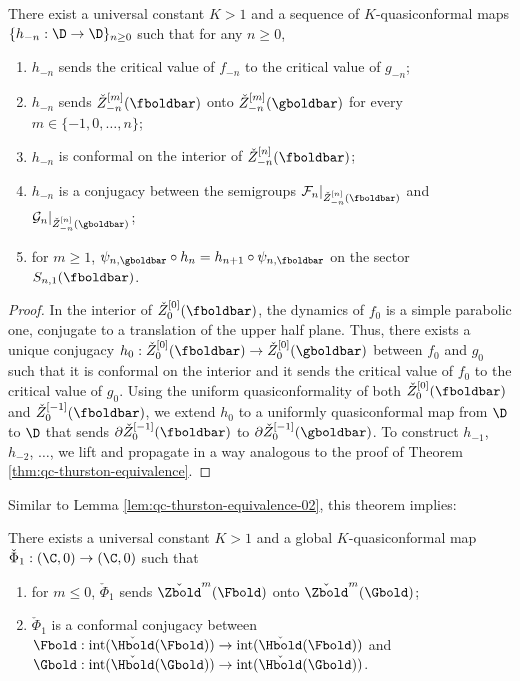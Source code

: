 \documentclass{amsart}
\begin{document}
\begin{theorem}
    There exist a universal constant $K>1$ and a sequence of $K$-quasiconformal maps $\{h_{-n} : \D \to \D\}_{n \geq 0}$ such that for any $n \geq 0$,
    \begin{enumerate}
        \item $h_{-n}$ sends the critical value of $f_{-n}$ to the critical value of $g_{-n}$;
        \item $h_{-n}$ sends $\check{Z}^{[m]}_{-n}(\fboldbar)$ onto $\check{Z}^{[m]}_{-n}(\gboldbar)$ for every $m \in \{-1,0,\ldots, n\}$;
        \item $h_{-n}$ is conformal on the interior of $\check{Z}^{[n]}_{-n}(\fboldbar)$;
        \item $h_{-n}$ is a conjugacy between the semigroups $\mathcal{F}_n|_{\check{Z}^{[n]}_{-n}(\fboldbar)}$ and $\mathcal{G}_n|_{\check{Z}^{[n]}_{-n}(\gboldbar)}$;
        \item for $m \geq 1$, $\psi_{n,\gboldbar} \circ h_n = h_{n+1} \circ \psi_{n,\fboldbar}$ on the sector $S_{n,1}(\fboldbar)$.
    \end{enumerate}
\end{theorem}

\begin{proof}
    In the interior of $\check{Z}_0^{[0]}(\fboldbar)$, the dynamics of $f_0$ is a simple parabolic one, conjugate to a translation of the upper half plane. 
    Thus, there exists a unique conjugacy $h_0: \check{Z}_0^{[0]}(\fboldbar) \to \check{Z}_0^{[0]}(\gboldbar)$ between $f_0$ and $g_0$ such that it is conformal on the interior and it sends the critical value of $f_0$ to the critical value of $g_0$.
    Using the uniform quasiconformality of both $\check{Z}_0^{[0]}(\fboldbar)$ and $\check{Z}_0^{[-1]}(\fboldbar)$, we extend $h_0$ to a uniformly quasiconformal map from $\D$ to $\D$ that sends $\partial \check{Z}_0^{[-1]}(\fboldbar)$ to $\partial \check{Z}_0^{[-1]}(\gboldbar)$.
    To construct $h_{-1}$, $h_{-2}$, $\ldots$, we lift and propagate in a way analogous to the proof of Theorem \ref{thm:qc-thurston-equivalence}.
\end{proof}

Similar to Lemma \ref{lem:qc-thurston-equivalence-02}, this theorem implies:

\begin{lemma}
    There exists a universal constant $K>1$ and a global $K$-quasiconformal map $\check{\Phi}_1: (\C,0) \to (\C,0)$ such that
    \begin{enumerate}
        \item for $m \leq 0$, $\check{\Phi}_1$ sends $\check{\Zbold}^m(\Fbold)$ onto $\check{\Zbold}^m(\Gbold)$;
        \item $\check{\Phi}_1$ is a conformal conjugacy between $\Fbold: \textnormal{int}(\check{\Hbold}(\Fbold)) \to \textnormal{int}(\check{\Hbold}(\Fbold))$ and $\Gbold: \textnormal{int}(\check{\Hbold}(\Gbold)) \to \textnormal{int}(\check{\Hbold}(\Gbold))$.
    \end{enumerate}
\end{lemma}
\end{document}
